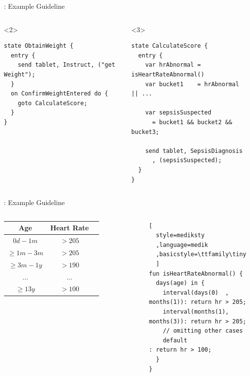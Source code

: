 \documentclass{beamer}
\begin{document}
\begin{frame}[fragile]{\MediK{}: Example Guideline}
  \begin{columns}
      
    \begin{onlyenv}<2>
      \begin{lstlisting}[language=medik, style=mediksty, basicstyle=\ttfamily\tiny]
state ObtainWeight {
  entry {
    send tablet, Instruct, ("get Weight");
  }
  on ConfirmWeightEntered do {
    goto CalculateScore;
  }
}
    \end{lstlisting}
    \end{onlyenv}
    \begin{onlyenv}<3>
      \begin{lstlisting}[language=medik, style=mediksty, basicstyle=\ttfamily\tiny]
state CalculateScore {
  entry {
    var hrAbnormal = isHeartRateAbnormal()
    var bucket1    = hrAbnormal || ...

    var sepsisSuspected
      = bucket1 && bucket2 && bucket3;

    send tablet, SepsisDiagnosis
      , (sepsisSuspected);
  }
}
      \end{lstlisting}
    \end{onlyenv}
  \end{columns}
\end{frame}

\begin{frame}[fragile]{\MediK{}: Example Guideline}
  \begin{columns}
    \tiny
    \begin{tabular}{ | c || c | c | }
      \hline
      \textbf{Age}            & \textbf{Heart Rate} \\
      \hline
      $0d - 1m$               & $>205$              \\
      \hline
      $\geq 1m - 3m$          & $>205$              \\
      \hline
      $\geq 3m - 1y$          & $>190$              \\
      \hline
      $\dots$                 & $\dots$             \\
      \hline
      $\geq 13y$              & $>100$              \\
      \hline
    \end{tabular}
\begin{lstlisting}[
  style=mediksty
  ,language=medik
  ,basicstyle=\ttfamily\tiny
  ]
fun isHeartRateAbnormal() {
  days(age) in {
    interval(days(0)  , months(1)): return hr > 205;
    interval(months(1), months(3)): return hr > 205;
    // omitting other cases
    default                       : return hr > 100;
  }
}
\end{lstlisting}
  \end{columns}
\end{frame}
\end{document}

